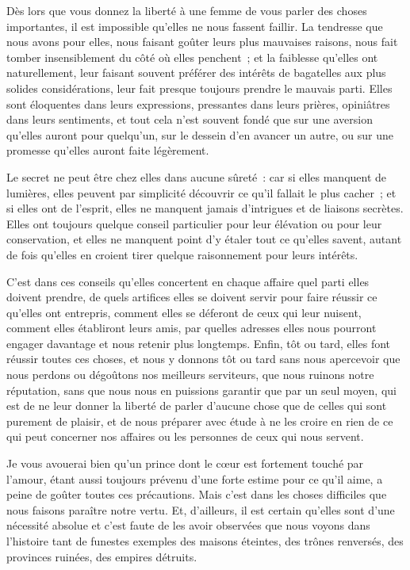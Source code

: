 \documentclass[french,twoside]{book} %
\begin{document}
Dès lors que vous donnez la liberté à une femme de vous parler des choses importantes, il est impossible qu’elles ne nous fassent faillir. La tendresse que nous avons pour elles, nous faisant goûter leurs plus mauvaises raisons, nous fait tomber insensiblement du côté où elles penchent ; et la faiblesse qu’elles ont naturellement, leur faisant souvent préférer des intérêts de bagatelles aux plus solides considérations, leur fait presque toujours prendre le mauvais parti. Elles sont éloquentes dans leurs expressions, pressantes dans leurs prières, opiniâtres dans leurs sentiments, et tout cela n’est souvent fondé que sur une aversion qu’elles auront pour quelqu’un, sur le dessein d’en avancer un autre, ou sur une promesse qu’elles auront faite légèrement.\par
Le secret ne peut être chez elles dans aucune sûreté : car si elles manquent de lumières, elles peuvent par simplicité découvrir ce qu’il fallait le plus cacher ; et si elles ont de l’esprit, elles ne manquent jamais d’intrigues et de liaisons secrètes. Elles ont toujours quelque conseil particulier pour leur élévation ou pour leur conservation, et elles ne manquent point d’y étaler tout ce qu’elles savent, autant de fois qu’elles en croient tirer quelque raisonnement pour leurs intérêts.\par
C’est dans ces conseils qu’elles concertent en chaque affaire quel parti elles doivent prendre, de quels artifices elles se doivent servir pour faire réussir ce qu’elles ont entrepris, comment elles se déferont de ceux qui leur nuisent, comment elles établiront leurs amis, par quelles adresses elles nous pourront engager davantage et nous retenir plus longtemps. Enfin, tôt ou tard, elles font réussir toutes ces choses, et nous y donnons tôt ou tard sans nous apercevoir que nous perdons ou dégoûtons nos meilleurs serviteurs, que nous ruinons notre réputation, sans que nous nous en puissions garantir que par un seul moyen, qui est de ne leur donner la liberté de parler d’aucune chose que de celles qui sont purement de plaisir, et de nous préparer avec étude à ne les croire en rien de ce qui peut concerner nos affaires ou les personnes de ceux qui nous servent.\par
Je vous avouerai bien qu’un prince dont le cœur est fortement touché par l’amour, étant aussi toujours prévenu d’une forte estime pour ce qu’il aime, a peine de goûter toutes ces précautions. Mais c’est dans les choses difficiles que nous faisons paraître notre vertu. Et, d’ailleurs, il est certain qu’elles sont d’une nécessité absolue et c’est faute de les avoir observées que nous voyons dans l’histoire tant de funestes exemples des maisons éteintes, des trônes renversés, des provinces ruinées, des empires détruits.
\end{document}

